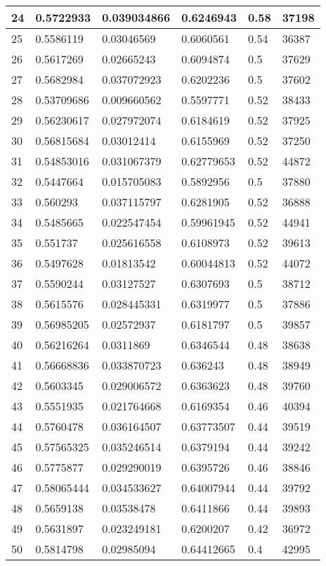\begin{longtable}{|l|l|l|l|l|l|}
24 & 0.5722933 & 0.039034866 & 0.6246943 & 0.58 & 37198 \\ \hline 
25 & 0.5586119 & 0.03046569 & 0.6060561 & 0.54 & 36387 \\ \hline 
26 & 0.5617269 & 0.02665243 & 0.6094874 & 0.5 & 37629 \\ \hline 
27 & 0.5682984 & 0.037072923 & 0.6202236 & 0.5 & 37602 \\ \hline 
28 & 0.53709686 & 0.009660562 & 0.5597771 & 0.52 & 38433 \\ \hline 
29 & 0.56230617 & 0.027972074 & 0.6184619 & 0.52 & 37925 \\ \hline 
30 & 0.56815684 & 0.03012414 & 0.6155969 & 0.52 & 37250 \\ \hline 
31 & 0.54853016 & 0.031067379 & 0.62779653 & 0.52 & 44872 \\ \hline 
32 & 0.5447664 & 0.015705083 & 0.5892956 & 0.5 & 37880 \\ \hline 
33 & 0.560293 & 0.037115797 & 0.6281905 & 0.52 & 36888 \\ \hline 
34 & 0.5485665 & 0.022547454 & 0.59961945 & 0.52 & 44941 \\ \hline 
35 & 0.551737 & 0.025616558 & 0.6108973 & 0.52 & 39613 \\ \hline 
36 & 0.5497628 & 0.01813542 & 0.60044813 & 0.52 & 44072 \\ \hline 
37 & 0.5590244 & 0.03127527 & 0.6307693 & 0.5 & 38712 \\ \hline 
38 & 0.5615576 & 0.028445331 & 0.6319977 & 0.5 & 37886 \\ \hline 
39 & 0.56985205 & 0.02572937 & 0.6181797 & 0.5 & 39857 \\ \hline 
40 & 0.56216264 & 0.0311869 & 0.6346544 & 0.48 & 38638 \\ \hline 
41 & 0.56668836 & 0.033870723 & 0.636243 & 0.48 & 38949 \\ \hline 
42 & 0.5603345 & 0.029006572 & 0.6363623 & 0.48 & 39760 \\ \hline 
43 & 0.5551935 & 0.021764668 & 0.6169354 & 0.46 & 40394 \\ \hline 
44 & 0.5760478 & 0.036164507 & 0.63773507 & 0.44 & 39519 \\ \hline 
45 & 0.57565325 & 0.035246514 & 0.6379194 & 0.44 & 39242 \\ \hline 
46 & 0.5775877 & 0.029290019 & 0.6395726 & 0.46 & 38846 \\ \hline 
47 & 0.58065444 & 0.034533627 & 0.64007944 & 0.44 & 39792 \\ \hline 
48 & 0.5659138 & 0.03538478 & 0.6411866 & 0.44 & 39893 \\ \hline 
49 & 0.5631897 & 0.023249181 & 0.6200207 & 0.42 & 36972 \\ \hline 
50 & 0.5814798 & 0.02985094 & 0.64412665 & 0.4 & 42995 \\ \hline 
\end{longtable}